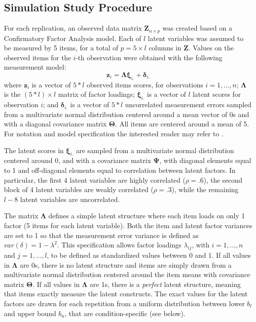
\subsection{Simulation Study Procedure}

	For each replication, an observed data matrix $\bm{Z}_{n \times p}$ was created based on a Confirmatory 
	Factor Analysis model.
	Each of $l$ latent variables was assumed to be measured by 5 items, for a total of $p = 5 \times l$ 
	columns in $\bm{Z}$.
	Values on the observed items for the $i$-th observation were obtained with the following measurement 
	model:
%
	\begin{equation}
		\bm{z}_i = \bm{\Lambda} \bm{\xi}_{i.} + \bm{\delta}_{i.}
	\end{equation}
%
	where $\bm{z}_i$ is a vector of $5*l$ observed items scores, for observations $i = 1, ..., n$;
	$\bm{\Lambda}$ is the $(5*l) \times l$ matrix of factor loadings; $\bm{\xi}_{i.}$ is a vector of $l$ latent scores 
	for observation $i$; and $\bm{\delta}_{i.}$ is a vector of $5*l$ uncorrelated measurement errors sampled from a 
	multivariate normal distribution centered around a mean vector of 0s and with a diagonal covariance matrix $\bm{\Theta}$.
	All items are centered around a mean of 5.
	For notation and model specification the interested reader may refer to \cite{bollen:1989}.

	The latent scores in $\bm{\xi}_{i.}$ are sampled from a multivariate normal distribution centered around 
	0, and with a covariance matrix $\bm{\Psi}$, with diagonal elements equal to 1 and off-diagonal elements 
	equal to correlation between latent factors. 
	In particular, the first 4 latent variables are highly correlated ($\rho = .6$), the second block of 4 
	latent variables are weakly correlated ($\rho = .3$), while the remaining $l-8$ latent variables are 
	uncorrelated.

	The matrix $\bm{\Lambda}$ defines a simple latent structure where each item loads on only 1 factor (5 items 
	for each latent variable).
	Both the item and latent factor variances are set to 1 so that the measurement error variance is defined as 
	$var(\delta) = 1 - \lambda^{2}$.
	This specification allows factor loadings $\lambda_{ij}$, with $i = 1, ..., n$ and $j = 1, ..., l$, to be
	defined as standardized values between 0 and 1.
	If all values in $\bm{\Lambda}$ are 0s, there is no latent structure and items are simply drawn from a
	multivariate normal distribution centered around the item means with covariance matrix $\bm{\Theta}$.
	If all values in $\bm{\Lambda}$ are 1s, there is a \emph{perfect} latent structure, meaning that items
	exactly measure the latent constructs.
	The exact values for the latent factors are drawn for each repetition from a uniform distribution between
	lower $b_l$ and upper bound $b_u$, that are condition-specific (see below).

